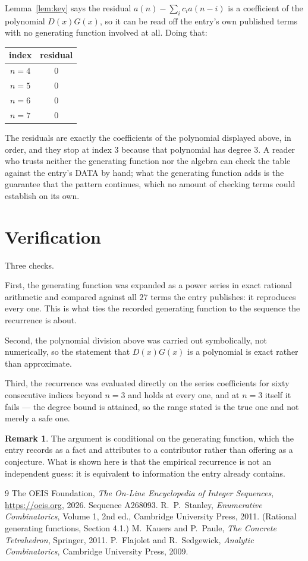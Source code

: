 \documentclass[11pt,a4paper]{article}
\theoremstyle{plain}
\theoremstyle{definition}
\newtheorem{remark}[theorem]{Remark}
\begin{document}
Lemma~\ref{lem:key} says the residual $a(n)-\sum_ic_ia(n-i)$ is a coefficient of the
polynomial $D(x)G(x)$, so it can be read off the entry's own published terms with no
generating function involved at all. Doing that:
\begin{center}
\begin{tabular}{cc}
index & residual \\ \hline
$n=4$ & $0$ \\
$n=5$ & $0$ \\
$n=6$ & $0$ \\
$n=7$ & $0$
\end{tabular}
\end{center}
The residuals are exactly the coefficients of the polynomial displayed above, in order, and
they stop at index $3$ because that polynomial has degree $3$. A reader who trusts
neither the generating function nor the algebra can check the table against the entry's DATA
by hand; what the generating function adds is the guarantee that the pattern continues, which
no amount of checking terms could establish on its own.

\section{Verification}

Three checks.

First, the generating function was expanded as a power series in exact rational arithmetic and
compared against all $27$ terms the entry publishes: it reproduces every one. This is
what ties the recorded generating function to the sequence the recurrence is about.

Second, the polynomial division above was carried out symbolically, not numerically, so the
statement that $D(x)G(x)$ is a polynomial is exact rather than approximate.

Third, the recurrence was evaluated directly on the series coefficients for sixty consecutive
indices beyond $n=3$ and holds at every one, and at $n=3$ itself it fails --- the
degree bound is attained, so the range stated is the true one and not merely a safe one.

\begin{remark}
The argument is conditional on the generating function, which the entry records as a fact and
attributes to a contributor rather than offering as a conjecture. What is shown here is that
the empirical recurrence is not an independent guess: it is equivalent to information the
entry already contains.
\end{remark}

\begin{thebibliography}{9}
 The OEIS Foundation, \emph{The On-Line Encyclopedia of Integer
Sequences}, \url{https://oeis.org}, 2026. Sequence A268093.
 R.~P.~Stanley, \emph{Enumerative Combinatorics}, Volume 1, 2nd ed.,
Cambridge University Press, 2011. (Rational generating functions, Section 4.1.)
 M.~Kauers and P.~Paule, \emph{The Concrete Tetrahedron}, Springer, 2011.
 P.~Flajolet and R.~Sedgewick, \emph{Analytic Combinatorics}, Cambridge
University Press, 2009.
\end{thebibliography}
\end{document}
